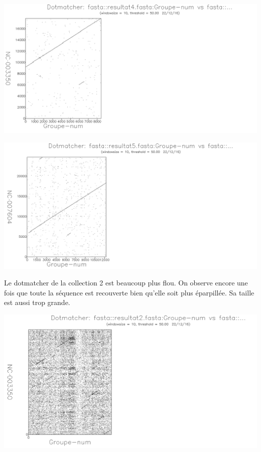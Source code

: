 \documentclass{article}
\begin{document}
\begin{center}
\includegraphics[scale=0.5]{dotmatcher4.png}
\end{center}

\begin{center}
\includegraphics[scale=0.5]{dotmatcher5.png}
\end{center}

Le dotmatcher de la collection 2 est beaucoup plus flou. On observe encore une fois que toute la séquence est recouverte bien qu'elle soit plus éparpillée. Sa taille est aussi trop grande.
\begin{center}
\includegraphics[scale=0.5]{dotmatcher2.png}
\end{center}
\end{document}
